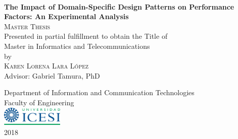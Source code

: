 \documentclass[letterpaper,12pt]{report}
\begin{document}
	
	
	\begin{titlepage}
		\begin{center}
			
			~\\
			
			{ \Huge \textbf{The Impact of Domain-Specific Design Patterns on Performance Factors: An Experimental Analysis}
			}\\[3cm]
			
			
			\textsc{\Large Master Thesis}\\ [1cm]
			
			Presented in partial fulfillment to obtain the Title of \\
			Master in Informatics and Telecommunications \\[3cm]
			
			by \\[0.5cm]
			
			\textsc{\Large Karen Lorena Lara L\'opez }\\[1cm]
			
			\large{Advisor:} Gabriel Tamura, PhD\\
			
			\vfill
			
			{\Large Department of Information and Communication Technologies}\\[0.3cm]
			{\Large Faculty of Engineering}\\[0.5cm]
			
			\includegraphics[width=0.22\textwidth]{img/logo-icesi.png}\\[0.3cm]
			
			\large 2018\\
			
		\end{center}
		
	\end{titlepage}
	
	
	
	\tableofcontents
	
	\sloppy
	
\end{document}
